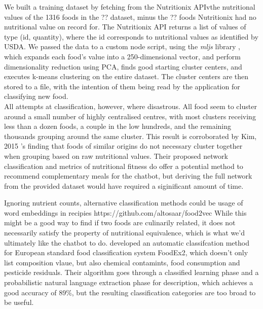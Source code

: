 We built a training dataset by fetching from the Nutritionix APIvthe nutritional values of the 1316 foods in the ?? dataset, minus the ?? foods Nutritionix had no nutritional value on record for. The Nutritionix API returns a list of values of type (id, quantity), where the id corresponds to nutritional values as identified by USDA. We passed the data to a custom node script, using the \textit{mljs} library \cite{}, which expands each food's value into a 250-dimensional vector, and perform dimensionality reduction using PCA\cite{Ding2004}, finds good starting cluster centers, and executes k-means clustering on the entire dataset. The cluster centers are then stored to a file, with the intention of them being read by the application for classifying new food. \\
All attempts at classification, however, where disastrous. All food seem to cluster around a small number of highly centralised centres, with most clusters receiving less than a dozen foods, a couple in the low hundreds, and the remaining thousands grouping around the same cluster. This result is corroborated by Kim, 2015 \cite{Kim2015a}'s finding that foods of similar origins do not necessary cluster together when grouping based on raw nutritional values. Their proposed network classification and metrics of nutritional fitness do offer a potential method to recommend complementary meals for the chatbot, but deriving the full network from the provided dataset would have required a siginificant amount of time.

Ignoring nutrient counts, alternative classification methods could be usage of word embeddings in recipies https://github.com/altosaar/food2vec While this might be a good way to find if two foods are culinarily related, it does not necessarily satisfy the property of nutritional equivalence, which is what we'd ultimately like the chatbot to do.
\cite{Eftimov2017} developed an automatic classifcation method for European standard food classification system FoodEx2, which doesn't only list composition vlaue, but also chemical contamints, food consumption and pesticide residuals. Their algorithm goes through a classified learning phase and a probabilistic natural language extraction phase for description, which achieves a good accuracy of 89\%, but the resulting classification categories are too broad to be useful.


